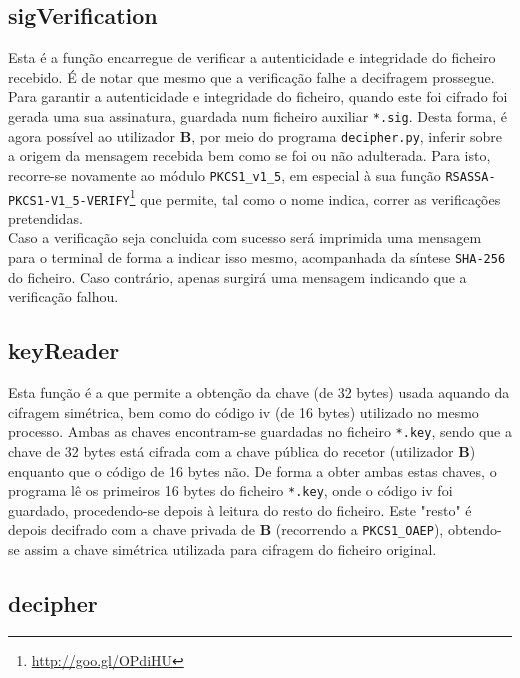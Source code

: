 \documentclass[a4paper,11pt,openright,oneside]{report}
\begin{document}
\subsection{sigVerification}

Esta é a função encarregue de verificar a autenticidade e integridade do ficheiro recebido. É de notar que mesmo que a verificação falhe a decifragem prossegue.\\

Para garantir a autenticidade e integridade do ficheiro, quando este foi cifrado foi gerada uma sua assinatura, guardada num ficheiro auxiliar \verb|*.sig|. Desta forma, é agora possível ao utilizador \textbf{B}, por meio do programa \verb|decipher.py|, inferir sobre a origem da mensagem recebida bem como se foi ou não adulterada. Para isto, recorre-se novamente ao módulo \verb|PKCS1_v1_5|, em especial à sua função \verb|RSASSA-PKCS1-V1_5-VERIFY|\footnote{\url{http://goo.gl/OPdiHU}} que permite, tal como o nome indica, correr as verificações pretendidas.\\

Caso a verificação seja concluida com sucesso será imprimida uma mensagem para o terminal de forma a indicar isso mesmo, acompanhada da síntese \verb|SHA-256| do ficheiro. Caso contrário, apenas surgirá uma mensagem indicando que a verificação falhou.

\subsection{keyReader}

Esta função é a que permite a obtenção da chave (de 32 bytes) usada aquando da cifragem simétrica, bem como do código iv (de 16 bytes) utilizado no mesmo processo. Ambas as chaves encontram-se guardadas no ficheiro \verb|*.key|, sendo que a chave de 32 bytes está cifrada com a chave pública do recetor (utilizador \textbf{B}) enquanto que o código de 16 bytes não. De forma a obter ambas estas chaves, o programa lê os primeiros 16 bytes do ficheiro \verb|*.key|, onde o código iv foi guardado, procedendo-se depois à leitura do resto do ficheiro. Este "resto" é depois decifrado com a chave privada de \textbf{B} (recorrendo a \verb|PKCS1_OAEP|), obtendo-se assim a chave simétrica utilizada para cifragem do ficheiro original.

\subsection{decipher}
\end{document}
